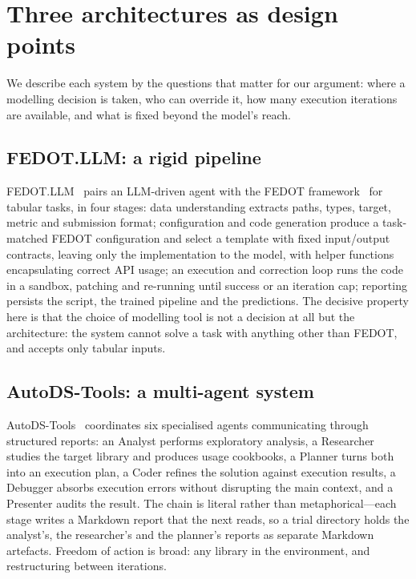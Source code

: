 \section{Three architectures as design points}
\label{sec:systems}

We describe each system by the questions that matter for our argument: where a
modelling decision is taken, who can override it, how many execution iterations
are available, and what is fixed beyond the model's reach.

\subsection{FEDOT.LLM: a rigid pipeline}

FEDOT.LLM~\citep{fedotllm} pairs an LLM-driven agent with the FEDOT
framework~\citep{nikitin2022fedot} for tabular tasks, in four stages: data
understanding extracts paths, types, target, metric and submission format;
configuration and code generation produce a task-matched FEDOT configuration and
select a template with fixed input/output contracts, leaving only the
implementation to the model, with helper functions encapsulating correct API
usage; an execution and correction loop runs the code in a sandbox, patching and
re-running until success or an iteration cap; reporting persists the script, the
trained pipeline and the predictions. The decisive property here is that the
choice of modelling tool is not a decision at all but the architecture: the
system cannot solve a task with anything other than FEDOT, and accepts only
tabular inputs.

\subsection{AutoDS-Tools: a multi-agent system}

AutoDS-Tools~\citep{autodstools} coordinates six specialised agents communicating
through structured reports: an Analyst performs exploratory analysis, a Researcher studies the
target library and produces usage cookbooks, a Planner turns both into an
execution plan, a Coder refines the solution against execution results, a
Debugger absorbs execution errors without disrupting the main context, and a
Presenter audits the result. The chain is literal rather than metaphorical---each
stage writes a Markdown report that the next reads, so a trial directory holds
the analyst's, the researcher's and the planner's reports as separate Markdown
artefacts. Freedom of action is broad: any library
in the environment, and restructuring between iterations.

